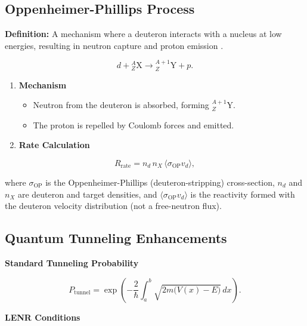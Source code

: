 \documentclass[11pt,a4paper]{article}
\begin{document}
\subsection{Oppenheimer-Phillips Process}

\textbf{Definition:} A mechanism where a deuteron interacts with a nucleus at low energies, resulting in neutron capture and proton emission \citep{oppenheimer1935}.

\begin{equation}
d + {}^{A}_{Z}\text{X} \longrightarrow {}^{A+1}_{Z}\text{Y} + p.
\end{equation}

\begin{enumerate}
\def\labelenumi{\arabic{enumi}.}
\item
  \textbf{Mechanism}

  \begin{itemize}
    \item
    Neutron from the deuteron is absorbed, forming ${}^{A+1}_{Z}\text{Y}$.\\
  \item
    The proton is repelled by Coulomb forces and emitted.\\
  \end{itemize}
\item
  \textbf{Rate Calculation}
\end{enumerate}

\begin{equation}
R_{\text{rate}} = n_d\,n_X\,\langle\sigma_{\text{OP}} v_d\rangle,
\end{equation}

where $\sigma_{\text{OP}}$ is the Oppenheimer-Phillips (deuteron-stripping) cross-section, $n_d$ and $n_X$ are deuteron and target densities, and $\langle\sigma_{\text{OP}} v_d\rangle$ is the reactivity formed with the deuteron velocity distribution (not a free-neutron flux).

\subsection{Quantum Tunneling Enhancements}

\textbf{Standard Tunneling Probability}

\begin{equation}
P_{\text{tunnel}} = \exp\left(-\frac{2}{\hbar}\int_{a}^{b}\sqrt{2m\bigl(V(x)-E\bigr)}\,dx\right).
\end{equation}

\textbf{LENR Conditions}
\end{document}
